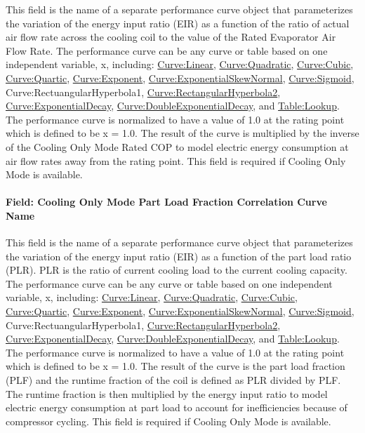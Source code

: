 This field is the name of a separate performance curve object that parameterizes the variation of the energy input ratio (EIR) as a function of the ratio of actual air flow rate across the cooling coil to the value of the Rated Evaporator Air Flow Rate. The performance curve can be any curve or table based on one independent variable, x, including: \hyperref[curvelinear]{Curve:Linear}, \hyperref[curvequadratic]{Curve:Quadratic}, \hyperref[curvecubic]{Curve:Cubic}, \hyperref[curvequartic]{Curve:Quartic}, \hyperref[curveexponent]{Curve:Exponent}, \hyperref[curveexponentialskewnormal]{Curve:ExponentialSkewNormal}, \hyperref[curvesigmoid]{Curve:Sigmoid}, Curve:RectuangularHyperbola1, \hyperref[curverectangularhyperbola2]{Curve:RectangularHyperbola2}, \hyperref[curveexponentialdecay]{Curve:ExponentialDecay}, \hyperref[curvedoubleexponentialdecay]{Curve:DoubleExponentialDecay}, and \hyperref[tablelookup]{Table:Lookup}. The performance curve is normalized to have a value of 1.0 at the rating point which is defined to be x = 1.0. The result of the curve is multiplied by the inverse of the Cooling Only Mode Rated COP to model electric energy consumption at air flow rates away from the rating point. This field is required if Cooling Only Mode is available.

\paragraph{Field: Cooling Only Mode Part Load Fraction Correlation Curve Name}\label{field-cooling-only-mode-part-load-fraction-correlation-curve-name}

This field is the name of a separate performance curve object that parameterizes the variation of the energy input ratio (EIR) as a function of the part load ratio (PLR). PLR is the ratio of current cooling load to the current cooling capacity. The performance curve can be any curve or table based on one independent variable, x, including: \hyperref[curvelinear]{Curve:Linear}, \hyperref[curvequadratic]{Curve:Quadratic}, \hyperref[curvecubic]{Curve:Cubic}, \hyperref[curvequartic]{Curve:Quartic}, \hyperref[curveexponent]{Curve:Exponent}, \hyperref[curveexponentialskewnormal]{Curve:ExponentialSkewNormal}, \hyperref[curvesigmoid]{Curve:Sigmoid}, Curve:RectuangularHyperbola1, \hyperref[curverectangularhyperbola2]{Curve:RectangularHyperbola2}, \hyperref[curveexponentialdecay]{Curve:ExponentialDecay}, \hyperref[curvedoubleexponentialdecay]{Curve:DoubleExponentialDecay}, and \hyperref[tablelookup]{Table:Lookup}. The performance curve is normalized to have a value of 1.0 at the rating point which is defined to be x = 1.0. The result of the curve is the part load fraction (PLF) and the runtime fraction of the coil is defined as PLR divided by PLF. The runtime fraction is then multiplied by the energy input ratio to model electric energy consumption at part load to account for inefficiencies because of compressor cycling. This field is required if Cooling Only Mode is available.

